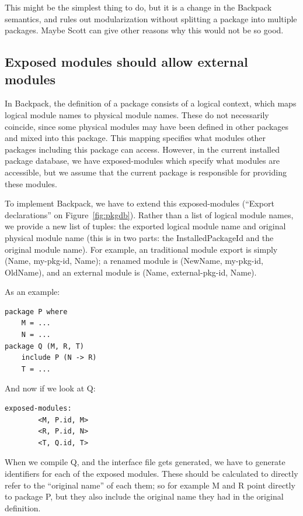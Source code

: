 \documentclass{article}
\begin{document}
This might be the simplest thing to do, but it is a change in the
Backpack semantics, and rules out modularization without splitting a package
into multiple packages.  Maybe Scott can give other reasons why this
would not be so good.

\subsection{Exposed modules should allow external modules}\label{sec:reexport}

In Backpack, the definition of a package consists of a logical context,
which maps logical module names to physical module names.  These do not
necessarily coincide, since some physical modules may have been defined
in other packages and mixed into this package.  This mapping specifies
what modules other packages including this package can access.
However, in the current installed package database, we have exposed-modules which
specify what modules are accessible, but we assume that the current
package is responsible for providing these modules.

To implement Backpack, we have to extend this exposed-modules (``Export declarations''
on Figure~\ref{fig:pkgdb}).  Rather
than a list of logical module names, we provide a new list of tuples:
the exported logical module name and original physical module name (this
is in two parts: the InstalledPackageId and the original module name).
For example, an traditional module export is simply (Name, my-pkg-id, Name);
a renamed module is (NewName, my-pkg-id, OldName), and an external module
is (Name, external-pkg-id, Name).

As an example:

\begin{verbatim}
package P where
    M = ...
    N = ...
package Q (M, R, T)
    include P (N -> R)
    T = ...
\end{verbatim}

And now if we look at Q\@:

\begin{verbatim}
exposed-modules:
        <M, P.id, M>
        <R, P.id, N>
        <T, Q.id, T>
\end{verbatim}

When we compile Q, and the interface file gets generated, we have
to generate identifiers for each of the exposed modules.  These should
be calculated to directly refer to the ``original name'' of each them;
so for example M and R point directly to package P, but they also
include the original name they had in the original definition.
\end{document}
